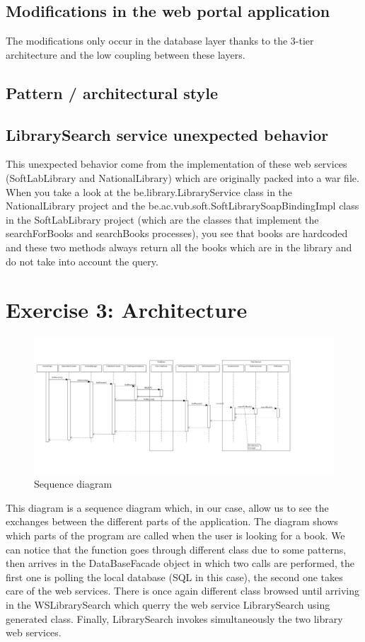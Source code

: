 \documentclass[a4paper,10pt]{article}
\begin{document}
\subsection{Modifications in the web portal application}
The modifications only occur in the database layer thanks to the 3-tier architecture and the low coupling between these layers.

\subsection{Pattern / architectural style}

\subsection{LibrarySearch service unexpected behavior}
This unexpected behavior come from the implementation of these web services (SoftLabLibrary and NationalLibrary) which are originally packed into a war file. When you take a look at the be.library.LibraryService class in the NationalLibrary project and the be.ac.vub.soft.SoftLibrarySoapBindingImpl class in the SoftLabLibrary project (which are the classes that implement the searchForBooks and searchBooks processes), you see that books are hardcoded and these two methods always return all the books which are in the library and do not take into account the query.


\section{Exercise 3: Architecture}
\clearpage
\begin{landscape}
\begin{figure}[h]
   \includegraphics[scale=0.4]{uml/sequence.png}
   \caption{\label{sequence} Sequence diagram}
\end{figure}
\end{landscape}
This diagram is a sequence diagram which, in our case, allow us to see the exchanges between the different parts of the application. The diagram shows which parts of the program are called when the user is looking for a book. We can notice that the function goes through different class due to some patterns, then arrives in the DataBaseFacade object in which two calls are performed, the first one is polling the local database (SQL in this case), the second one takes care of the web services. There is once again different class browsed until arriving in the WSLibrarySearch which querry the web service LibrarySearch using generated class. Finally, LibrarySearch invokes simultaneously the two library web services.
\end{document}
